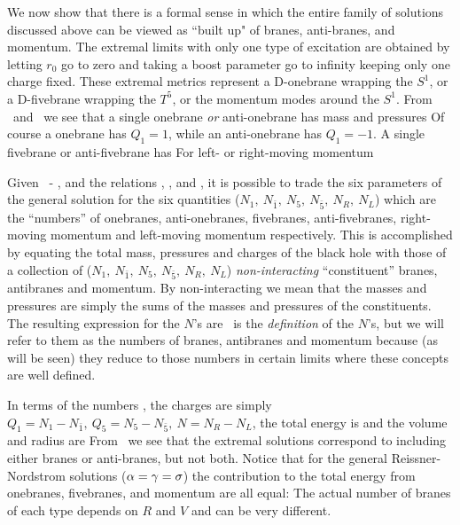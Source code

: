 We now show that there is a formal sense in
which the entire family of solutions
discussed above  can
be viewed as  ``built up" of branes, anti-branes, and momentum.
The extremal limits with only one type of excitation are
 obtained
by letting $r_0$ go to zero and  taking a   
boost parameter go to infinity keeping only one
charge  fixed. These extremal metrics represent a D-onebrane wrapping
the $S^1$, or  a D-fivebrane wrapping the $T^5$,
or the momentum modes
around the $S^1$.
 From \mss\ and \psses\ we see that a single
 onebrane {\it or} anti-onebrane has
mass and pressures
\eqn{}
Of course a onebrane has $Q_1 =1$, while an anti-onebrane has $Q_1 = -1$.
A single fivebrane  or
anti-fivebrane has
\eqn{}
For left- or right-moving momentum
\eqn{}

Given \obc\ - \sbc,  and the relations \charges, \mss, and \psses,
it is possible to trade the six parameters of the general solution
for the six quantities ($N_1,~N_{\bar 1},~N_5,~N_{\bar 5},~N_R,~N_L$)
which are the ``numbers'' of onebranes, anti-onebranes, fivebranes,
anti-fivebranes, right-moving momentum and left-moving momentum
respectively. This is accomplished by equating the total
mass, pressures and charges of the black hole with
those of a collection of  ($N_1,~N_{\bar 1},~N_5,~N_{\bar 5},~N_R,~N_L$)
{\it non-interacting} ``constituent'' branes, antibranes and momentum.
By non-interacting we mean that the masses and pressures are simply
 the sums
of the masses and pressures of the constituents.
The resulting expression for the $N$'s are
\eqn{}
\dbranes\ is the {\it definition} of the $N$'s, but we will refer to them
as the numbers of branes, antibranes and momentum  because
(as will be seen) they reduce
to those numbers in certain limits where these concepts are well defined.

In terms of the numbers \dbranes, the charges are simply
$Q_1 = N_1 - N_{\bar 1}, \ Q_5 = N_5 - N_{\bar 5}, \ N = N_R - N_L$,
the total energy is
\eqn{}
and the volume  and radius are
\eqn{}
\eqn{}
 From \extl\ we see that the extremal solutions correspond to including
 either branes or anti-branes, but not both. Notice that for the general
 Reissner-Nordstrom solutions ($\alpha = \gamma = \sigma$) the contribution to
 the total energy from onebranes, fivebranes, and momentum  are all equal:
\eqn{}
The actual number of branes of each type  depends on $R$ and $V$ and
can be very different.


